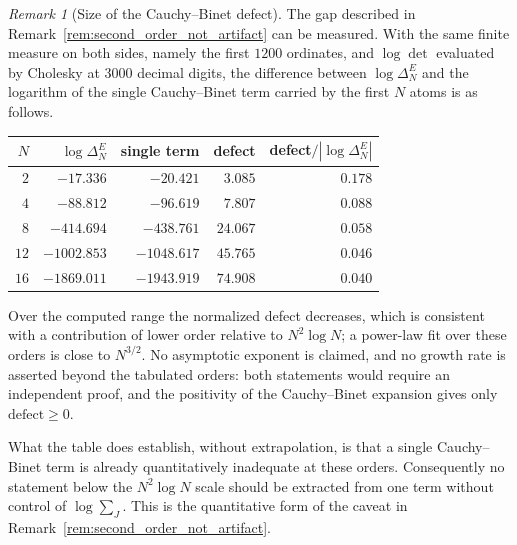 \documentclass[11pt]{amsart}
\numberwithin{equation}{section}
\theoremstyle{plain}
\theoremstyle{definition}
\theoremstyle{remark}
\newtheorem{remark}[theorem]{Remark}
\begin{document}
\begin{remark}[Size of the Cauchy--Binet defect]
\label{rem:cauchy_binet_defect_numerics}
The gap described in Remark~\ref{rem:second_order_not_artifact} can be measured. With the same finite measure on both sides, namely the first $1200$ ordinates, and $\log\det$ evaluated by Cholesky at $3000$ decimal digits, the difference between $\log\Delta_N^E$ and the logarithm of the single Cauchy--Binet term carried by the first $N$ atoms is as follows.
\begin{center}
\begin{tabular}{rrrrr}
$N$ & $\log\Delta_N^E$ & single term & defect & defect$/|\log\Delta_N^E|$\\
\hline
$2$ & $-17.336$ & $-20.421$ & $3.085$ & $0.178$\\
$4$ & $-88.812$ & $-96.619$ & $7.807$ & $0.088$\\
$8$ & $-414.694$ & $-438.761$ & $24.067$ & $0.058$\\
$12$ & $-1002.853$ & $-1048.617$ & $45.765$ & $0.046$\\
$16$ & $-1869.011$ & $-1943.919$ & $74.908$ & $0.040$
\end{tabular}
\end{center}
Over the computed range the normalized defect decreases, which is consistent with a contribution of lower order relative to $N^2\log N$; a power-law fit over these orders is close to $N^{3/2}$. No asymptotic exponent is claimed, and no growth rate is asserted beyond the tabulated orders: both statements would require an independent proof, and the positivity of the Cauchy--Binet expansion gives only $\text{defect}\ge0$.

What the table does establish, without extrapolation, is that a single Cauchy--Binet term is already quantitatively inadequate at these orders. Consequently no statement below the $N^2\log N$ scale should be extracted from one term without control of $\log\sum_J$. This is the quantitative form of the caveat in Remark~\ref{rem:second_order_not_artifact}.
\end{remark}
\end{document}
